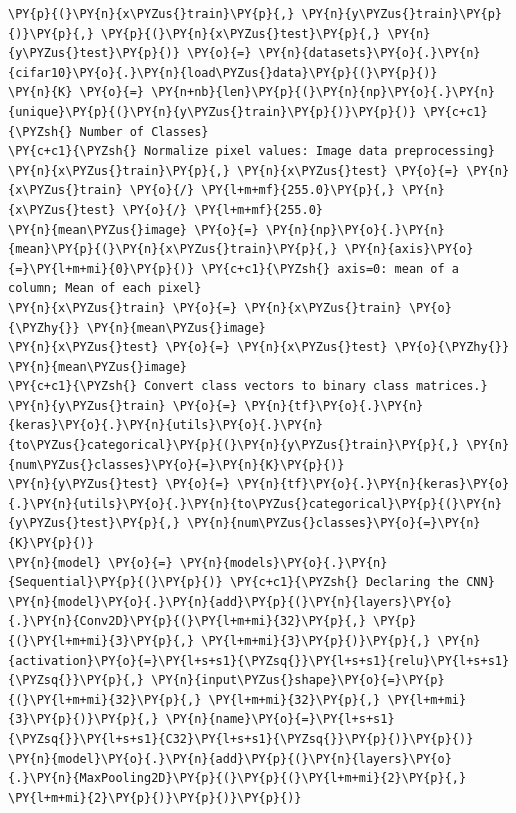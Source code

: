 \documentclass[a4paper,11pt]{article}%
\begin{document}
    \begin{tcolorbox}[breakable, size=fbox, boxrule=1pt, pad at break*=1mm,colback=cellbackground, colframe=cellborder]
\begin{Verbatim}[commandchars=\\\{\}]
\PY{p}{(}\PY{n}{x\PYZus{}train}\PY{p}{,} \PY{n}{y\PYZus{}train}\PY{p}{)}\PY{p}{,} \PY{p}{(}\PY{n}{x\PYZus{}test}\PY{p}{,} \PY{n}{y\PYZus{}test}\PY{p}{)} \PY{o}{=} \PY{n}{datasets}\PY{o}{.}\PY{n}{cifar10}\PY{o}{.}\PY{n}{load\PYZus{}data}\PY{p}{(}\PY{p}{)}
\PY{n}{K} \PY{o}{=} \PY{n+nb}{len}\PY{p}{(}\PY{n}{np}\PY{o}{.}\PY{n}{unique}\PY{p}{(}\PY{n}{y\PYZus{}train}\PY{p}{)}\PY{p}{)} \PY{c+c1}{\PYZsh{} Number of Classes}
\PY{c+c1}{\PYZsh{} Normalize pixel values: Image data preprocessing}
\PY{n}{x\PYZus{}train}\PY{p}{,} \PY{n}{x\PYZus{}test} \PY{o}{=} \PY{n}{x\PYZus{}train} \PY{o}{/} \PY{l+m+mf}{255.0}\PY{p}{,} \PY{n}{x\PYZus{}test} \PY{o}{/} \PY{l+m+mf}{255.0}
\PY{n}{mean\PYZus{}image} \PY{o}{=} \PY{n}{np}\PY{o}{.}\PY{n}{mean}\PY{p}{(}\PY{n}{x\PYZus{}train}\PY{p}{,} \PY{n}{axis}\PY{o}{=}\PY{l+m+mi}{0}\PY{p}{)} \PY{c+c1}{\PYZsh{} axis=0: mean of a column; Mean of each pixel}
\PY{n}{x\PYZus{}train} \PY{o}{=} \PY{n}{x\PYZus{}train} \PY{o}{\PYZhy{}} \PY{n}{mean\PYZus{}image}
\PY{n}{x\PYZus{}test} \PY{o}{=} \PY{n}{x\PYZus{}test} \PY{o}{\PYZhy{}} \PY{n}{mean\PYZus{}image}
\PY{c+c1}{\PYZsh{} Convert class vectors to binary class matrices.}
\PY{n}{y\PYZus{}train} \PY{o}{=} \PY{n}{tf}\PY{o}{.}\PY{n}{keras}\PY{o}{.}\PY{n}{utils}\PY{o}{.}\PY{n}{to\PYZus{}categorical}\PY{p}{(}\PY{n}{y\PYZus{}train}\PY{p}{,} \PY{n}{num\PYZus{}classes}\PY{o}{=}\PY{n}{K}\PY{p}{)}
\PY{n}{y\PYZus{}test} \PY{o}{=} \PY{n}{tf}\PY{o}{.}\PY{n}{keras}\PY{o}{.}\PY{n}{utils}\PY{o}{.}\PY{n}{to\PYZus{}categorical}\PY{p}{(}\PY{n}{y\PYZus{}test}\PY{p}{,} \PY{n}{num\PYZus{}classes}\PY{o}{=}\PY{n}{K}\PY{p}{)}
\PY{n}{model} \PY{o}{=} \PY{n}{models}\PY{o}{.}\PY{n}{Sequential}\PY{p}{(}\PY{p}{)} \PY{c+c1}{\PYZsh{} Declaring the CNN}
\PY{n}{model}\PY{o}{.}\PY{n}{add}\PY{p}{(}\PY{n}{layers}\PY{o}{.}\PY{n}{Conv2D}\PY{p}{(}\PY{l+m+mi}{32}\PY{p}{,} \PY{p}{(}\PY{l+m+mi}{3}\PY{p}{,} \PY{l+m+mi}{3}\PY{p}{)}\PY{p}{,} \PY{n}{activation}\PY{o}{=}\PY{l+s+s1}{\PYZsq{}}\PY{l+s+s1}{relu}\PY{l+s+s1}{\PYZsq{}}\PY{p}{,} \PY{n}{input\PYZus{}shape}\PY{o}{=}\PY{p}{(}\PY{l+m+mi}{32}\PY{p}{,} \PY{l+m+mi}{32}\PY{p}{,} \PY{l+m+mi}{3}\PY{p}{)}\PY{p}{,} \PY{n}{name}\PY{o}{=}\PY{l+s+s1}{\PYZsq{}}\PY{l+s+s1}{C32}\PY{l+s+s1}{\PYZsq{}}\PY{p}{)}\PY{p}{)}
\PY{n}{model}\PY{o}{.}\PY{n}{add}\PY{p}{(}\PY{n}{layers}\PY{o}{.}\PY{n}{MaxPooling2D}\PY{p}{(}\PY{p}{(}\PY{l+m+mi}{2}\PY{p}{,} \PY{l+m+mi}{2}\PY{p}{)}\PY{p}{)}\PY{p}{)}

\end{Verbatim}
\end{tcolorbox}
\end{document}
